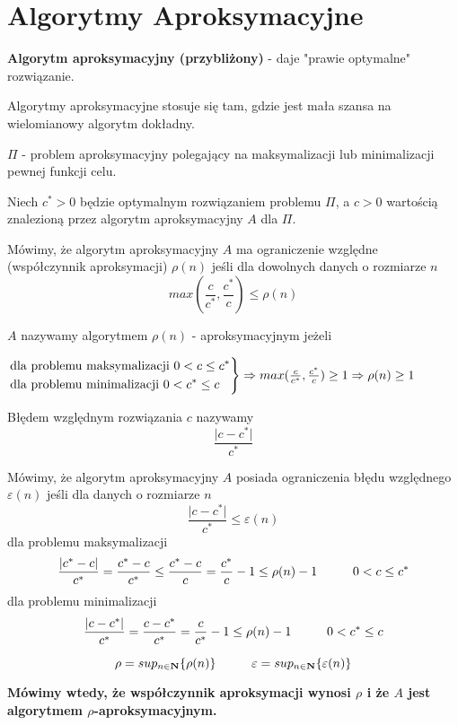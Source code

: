 \section{Algorytmy Aproksymacyjne}
\textbf{Algorytm aproksymacyjny (przybliżony)} - daje "prawie optymalne" rozwiązanie.

Algorytmy aproksymacyjne stosuje się tam, gdzie jest mała szansa na wielomianowy algorytm dokładny.

$\Pi$ - problem aproksymacyjny polegający na maksymalizacji lub minimalizacji pewnej funkcji celu.

Niech $c^{\ast} > 0$ będzie optymalnym rozwiązaniem problemu $\Pi$, a $c > 0$ wartością znalezioną przez algorytm aproksymacyjny $A$ dla $\Pi$.

Mówimy, że algorytm aproksymacyjny $A$ ma ograniczenie względne (współczynnik aproksymacji) $\rho (n)$ jeśli dla dowolnych danych o rozmiarze $n$ 
	$$max(\frac{c}{c^{\ast}},\frac{c^{\ast}}{c}) \leq \rho (n)$$

$A$ nazywamy algorytmem $\rho(n)$ - aproksymacyjnym jeżeli 
\begin{center}
	$\begin{drcases}
		\text{dla problemu maksymalizacji } 0<c\leq c^{\ast}\\
		\text{dla problemu minimalizacji } 0<c^{\ast}\leq c
	\end{drcases} 
	\Rightarrow max(\frac{c}{c^{\ast}},\frac{c^{\ast}}{c})\geq 1 \Rightarrow \rho(n) \geq 1$
\end{center}

Błędem względnym rozwiązania $c$ nazywamy $$\frac{\vert c-c^{\ast} \vert}{c^{\ast}}$$

Mówimy, że algorytm aproksymacyjny $A$ posiada ograniczenia błędu  względnego $\varepsilon (n)$ jeśli dla danych o rozmiarze $n$ $$\frac{\vert c-c^{\ast}\vert}{c^{\ast}} \leq \varepsilon (n)$$ 
dla problemu maksymalizacji 
$$	\frac{\vert c^{\ast} - c\vert}{c^{\ast}} 
	= \frac{c^\ast - c}{c^\ast}
	\leq \frac{c^\ast - c}{c}
	= \frac{c^{\ast}}{c} - 1 
	\leq \rho(n) - 1 
	\hspace*{1cm} 0 < c \leq c^{\ast} $$
dla problemu minimalizacji 
$$	\frac{\vert c - c^{\ast}\vert}{c^{\ast}} 
	= \frac{c - c^{\ast}}{c^\ast} 
	= \frac{c}{c^{\ast}} - 1 
	\leq \rho(n) - 1 
	\hspace*{1cm} 0 < c^{\ast} \leq c $$

$$
\rho = sup_{n \in \mathbf{N}}
	\lbrace \rho(n) \rbrace 
\hspace*{1cm} 
\varepsilon = sup_{n \in \mathbf{N}} 
	\lbrace\varepsilon (n) \rbrace
$$

\textbf{Mówimy wtedy, że współczynnik aproksymacji wynosi $\rho$ i że $A$ jest algorytmem $\rho$-aproksymacyjnym.}

